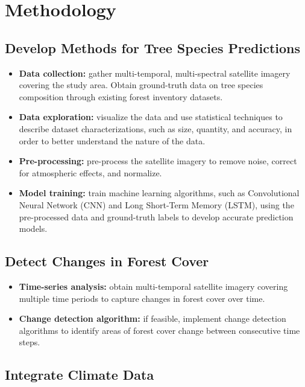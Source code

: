 \chapter{Methodology}

\section{Develop Methods for Tree Species Predictions}

\begin{itemize}
  \item \textbf{Data collection:} gather multi-temporal, multi-spectral satellite imagery covering the study area. Obtain ground-truth data on tree species composition through existing forest inventory datasets.

  \item \textbf{Data exploration:} visualize the data and use statistical techniques to describe dataset characterizations, such as size, quantity, and accuracy, in order to better understand the nature of the data.
  
  \item \textbf{Pre-processing:} pre-process the satellite imagery to remove noise, correct for atmospheric effects, and normalize.

  
  \item \textbf{Model training:} train machine learning algorithms, such as Convolutional Neural Network (CNN) and Long Short-Term Memory (LSTM), using the pre-processed data and ground-truth labels to develop accurate prediction models.
\end{itemize}

\section{Detect Changes in Forest Cover}

\begin{itemize}
  \item \textbf{Time-series analysis:} obtain multi-temporal satellite imagery covering multiple time periods to capture changes in forest cover over time.
  
  \item \textbf{Change detection algorithm:} if feasible, implement change detection algorithms to identify areas of forest cover change between consecutive time steps.
\end{itemize}

\section{Integrate Climate Data}

